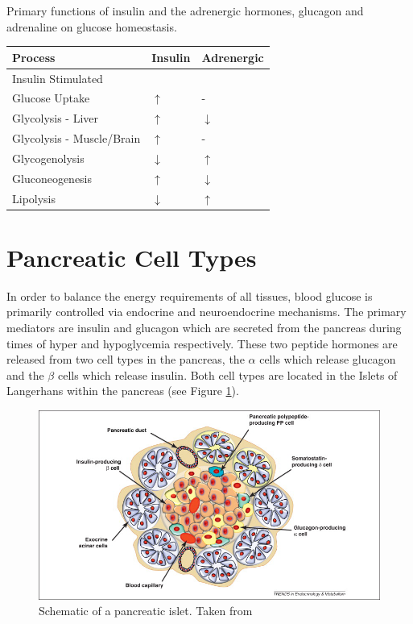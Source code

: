 \documentclass{tufte-handout}
\begin{document}
\begin{margintable}
\caption{Primary functions of insulin and the adrenergic hormones, glucagon and adrenaline on glucose homeostasis.}
\label{tab:endocrine-glucose}
\begin{tabular}{@{}lll@{}}
\textbf{Process }                          & \textbf{Insulin}  & \textbf{Adrenergic}           \\ \midrule
Insulin Stimulated \\Glucose Uptake & $\uparrow$ & -  \\ \midrule
Glycolysis - Liver & $\uparrow$ & $\downarrow$ \\  \midrule
Glycolysis - Muscle/Brain & $\uparrow$ & - \\  \midrule
Glycogenolysis & $\downarrow$ & $\uparrow$ \\ \midrule
Gluconeogenesis & $\uparrow$ & $\downarrow$\\ \midrule
Lipolysis & $\downarrow$ & $\uparrow$ \\ \bottomrule

\end{tabular}
\end{margintable}

\section{Pancreatic Cell Types}

In order to balance the energy requirements of all tissues, blood glucose is primarily controlled via endocrine and neuroendocrine mechanisms.  The primary mediators are insulin and glucagon which are secreted from the pancreas during times of hyper and hypoglycemia respectively.  These two peptide hormones are released from two cell types in the pancreas, the $\alpha$ cells which release glucagon and the $\beta$ cells which release insulin.  Both cell types are located in the Islets of Langerhans within the pancreas (see Figure \ref{pancreas-cells}).

\begin{figure}
\includegraphics{figures/insulin-cells.png}
\caption{Schematic of a pancreatic islet.  Taken from \citet{Efrat2012}}
\label{pancreas-cells}
\end{figure}
\end{document}
